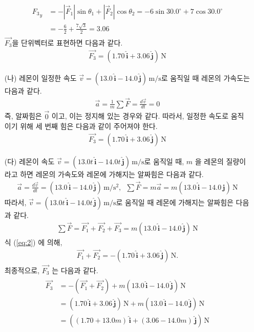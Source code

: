 \documentclass[floatfix,nofootinbib,superscriptaddress,fleqn,preprint]{revtex4}
\begin{document}
\begin{itemize}
\begin{align}
\begin{split}
      {F_3}_y&=-|\vec{F}_1|\sin{\theta_1}+|\vec{F}_2|\cos{\theta_2}
      =-6\sin{30.0^\circ}+7\cos{30.0^\circ}   \\
      &=-\frac{6}{2}+\frac{7\sqrt{3}}{2} = 3.06
    \end{split}
  \end{align}
  $\vec{F_3}$을 단위벡터로 표현하면 다음과 같다.
  \begin{align}\label{eq:2}
    \vec{F_3}=(1.70\,\hat{\bm{i}} +
    3.06\,\hat{\bm{j}})\,\mathrm{N}
  \end{align}
  \item[(나)] 레몬이 일정한 속도 $\vec{v} =(13.0\,\hat{\bm{i}} -
  14.0\,\hat{\bm{j}})\,\mathrm{m/s}$로 움직일 때 레몬의
  가속도는 다음과 같다.
  \begin{align}
    \vec{a} = \frac{1}{m}\sum\vec{F}=\frac{d\vec{v}}{dt} = 0
  \end{align}
  즉, 알짜힘은 $\vec{0}$ 이고, 이는 정지해 있는 경우와 같다.
  따라서, 일정한 속도로 움직이기 위해 세 번째 힘은 
  다음과 같이 주어져야 한다.
  \begin{align}
    \vec{F_3}=(1.70\,\hat{\bm{i}} +
    3.06\,\hat{\bm{j}})\,\mathrm{N}
  \end{align}
  \item[(다)] 레몬이 속도 $\vec{v} =(13.0t\,\hat{\bm{i}} -
  14.0t\,\hat{\bm{j}})\,\mathrm{m/s}$로 움직일 때, $m$ 을 레몬의 
  질량이라고 하면 레몬의 가속도와 레몬에 가해지는 알짜힘은 다음과 같다.
  \begin{align}
    \vec{a} = \frac{d\vec{v}}{dt} = (13.0\,\hat{\bm{i}} -
    14.0\,\hat{\bm{j}})\,\mathrm{m/s^2},\,\,\,
    \sum\vec{F}=m\vec{a} =m(13.0\,\hat{\bm{i}} -
    14.0\,\hat{\bm{j}})\,\mathrm{N}
  \end{align}
  따라서, $\vec{v} =(13.0t\,\hat{\bm{i}} -
  14.0t\,\hat{\bm{j}})\,\mathrm{m/s}$로 움직일 때 레몬에 가해지는 알짜힘은
  다음과 같다.
  \begin{align}
    \sum\vec{F} = \vec{F_1}+\vec{F_2}+\vec{F_3} 
    = m(13.0\,\hat{\bm{i}} - 14.0\,\hat{\bm{j}})\,\mathrm{N}
  \end{align}
  식 (\ref{eq:2}) 에 의해,
  \begin{align}
    \vec{F_1}+\vec{F_2} = -(1.70\,\hat{\bm{i}} +
    3.06\,\hat{\bm{j}})\,\mathrm{N}.
  \end{align}
  최종적으로, $\vec{F_3}$ 는 다음과 같다.
  \begin{align}
    \begin{split}
      \vec{F_3} &= -(\vec{F_1}+\vec{F_2})
      +m(13.0\,\hat{\bm{i}} -14.0\,\hat{\bm{j}})\,\mathrm{N}  \\
      &= (1.70\,\hat{\bm{i}} +3.06\,\hat{\bm{j}})\,\mathrm{N}
      +m(13.0\,\hat{\bm{i}} -14.0\,\hat{\bm{j}})\,\mathrm{N}  \\
      &=((1.70+13.0m)\,\hat{\bm{i}}+(3.06-14.0m)\,\hat{\bm{j}})\,\mathrm{N}
    \end{split}
  \end{align}
\end{itemize}
\vspace{2cm}
\end{document}
